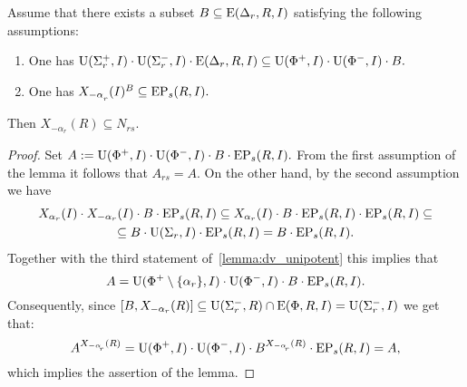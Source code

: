 
\begin{lemma}\label{lemma:Stein_reduction}
Assume that there exists a subset $B \subseteq \operatorname{E}(\Delta_r, R, I)$ satisfying the following assumptions:
\begin{enumerate}
 \item\label{stein_cond1} One has $\operatorname{U}(\Sigma^+_r, I)\cdot \operatorname{U}(\Sigma^-_r, I) \cdot \operatorname{E}(\Delta_r, R, I) \subseteq \operatorname{U}(\Phi^+, I)\cdot \operatorname{U}(\Phi^-, I) \cdot B.$
 \item\label{stein_cond2} One has $X_{-\alpha\ssub{r}}(I)^B \subseteq \EP_s(R, I).$
\end{enumerate}
Then $X_{-\alpha_r}(R) \subseteq N_{rs}.$
\end{lemma}
\begin{proof}
Set $A:=\operatorname{U}(\Phi^+, I)\cdot \operatorname{U}(\Phi^-, I) \cdot B \cdot \operatorname{EP}_s(R, I).$
From the first assumption of the lemma it follows that $A_{rs}=A$.
On the other hand, by the second assumption we have
\begin{multline*}
X_{\alpha_r}(I) \cdot X_{-\alpha_r}(I) \cdot B \cdot \operatorname{EP}_s(R, I) \subseteq 
X_{\alpha_r}(I) \cdot B \cdot \operatorname{EP}_s(R, I) \cdot \operatorname{EP}_s(R, I) \subseteq \\
\subseteq B \cdot \operatorname{U}(\Sigma_r, I) \cdot \operatorname{EP}_s(R, I) =
B \cdot \operatorname{EP}_s(R, I).
\end{multline*}
Together with the third statement of~\cref{lemma:dv_unipotent} this implies that
\begin{equation*} \label{rel:sred}
A = \operatorname{U}(\Phi^+\setminus\{\alpha_r\}, I) \cdot \operatorname{U}(\Phi^-, I) \cdot B \cdot \operatorname{EP}_s(R, I).
\end{equation*}
Consequently, since $[B, X_{-\alpha_r}(R)] \subseteq \operatorname{U}(\Sigma_r^-, R) \cap \operatorname{E}(\Phi, R, I) = \operatorname{U}(\Sigma_r^-, I)$ we get that:
\begin{equation*} \label{rel:ninv} A^{X_{-\alpha\ssub{r}}(R)} = \U(\Phi^+, I) \cdot \U(\Phi^-, I) \cdot B ^{X_{-\alpha\ssub{r}}(R)} \cdot \EP_s(R, I) = A, \end{equation*}
which implies the assertion of the lemma.
\end{proof}

